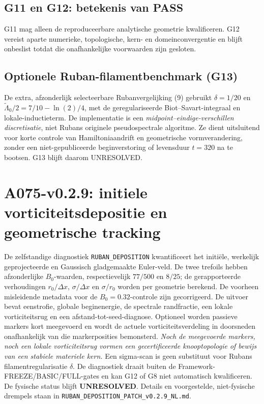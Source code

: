 \documentclass[10pt,a4paper]{article}
\begin{document}
\subsection{G11 en G12: betekenis van PASS}
G11 mag alleen de reproduceerbare analytische geometrie kwalificeren.
G12 vereist aparte numerieke, topologische, kern- en domeinconvergentie en blijft
onbeslist totdat die onafhankelijke voorwaarden zijn gesloten.
\subsection{Optionele Ruban-filamentbenchmark (G13)}
De extra, afzonderlijk selecteerbare Rubanvergelijking (9) gebruikt
$\delta=1/20$ en $\widetilde\Lambda_0/2=7/10-\ln(2)/4$,
met de geregulariseerde Biot--Savart-integraal en lokale-inductieterm.
De implementatie is een \emph{midpoint--eindige-verschillen discretisatie},
niet Rubans originele pseudospectrale algoritme. Ze dient uitsluitend voor
korte controle van Hamiltoniaandrift en geometrische vormverandering,
zonder een niet-gepubliceerde beginverstoring of levensduur $t=320$ na te bootsen.
G13 blijft daarom UNRESOLVED.
\section{A075-v0.2.9: initiele vorticiteitsdepositie en geometrische tracking}
De zelfstandige diagnostiek \texttt{RUBAN\_DEPOSITION} kwantificeert
het initi\"ele, werkelijk geprojecteerde en Gaussisch gladgemaakte Euler-veld.
De twee trefoils hebben afzonderlijke $B_0$-waarden, respectievelijk
$77/500$ en $8/25$; de gerapporteerde verhoudingen
$r_0/\Delta x$, $\sigma/\Delta x$ en $\sigma/r_0$ worden per geometrie berekend.
De voorheen misleidende metadata voor de $B_0=0.32$-controle zijn gecorrigeerd.
De uitvoer bevat eenstrofie, globale beginenergie, de spectrale
randfractie, een lokale vorticiteitsrug en een afstand-tot-seed-diagnose.
Optioneel worden passieve markers kort meegevoerd en wordt de actuele
vorticiteitsverdeling in doorsneden onafhankelijk van die markerposities bemonsterd.
\emph{Noch de meegevoerde markers, noch een lokale vorticiteitsrug vormen een
gecertificeerde knooptopologie of bewijs van een stabiele materiele kern.}
Een sigma-scan is geen substituut voor Rubans filamentregularisatie $\delta$.
De diagnostiek draait buiten de Framework-FREEZE/BASIC/FULL-gates en
kan G12 of G8 niet automatisch kwalificeren. De fysische status blijft
\textbf{UNRESOLVED}. Details en voorgestelde, niet-fysische drempels staan in
\texttt{RUBAN\_DEPOSITION\_PATCH\_v0.2.9\_NL.md}.
\end{document}
